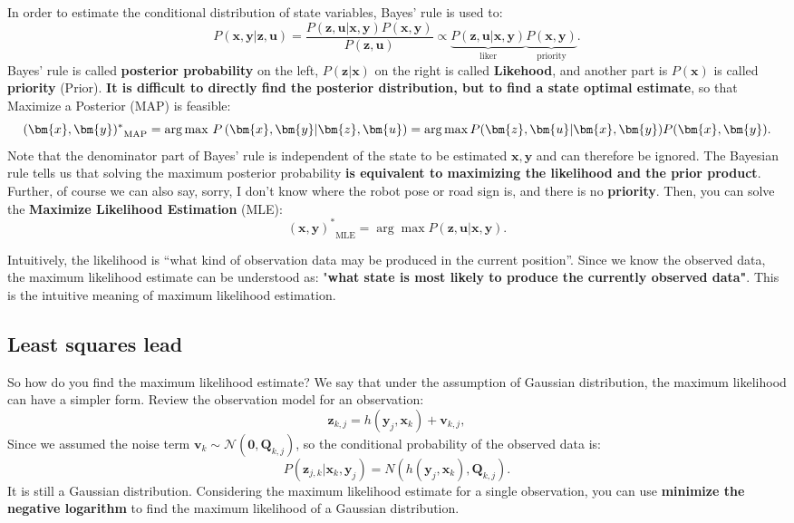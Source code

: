 In order to estimate the conditional distribution of state variables, Bayes' rule is used to:
\begin{equation}
P\left( { \bm{x},\bm{y}| \bm{z}, \bm{u}} \right) = \frac{{P\left( {\bm{z},\bm {u}|\bm{x},\bm{y}} \right)P\left( \bm{x}, \bm{y} \right)}}{{P\left( \bm{z} ,\bm{u}\right)}} \propto \underbrace{P\left( { \bm{z},\bm{u}| \bm{x},\bm{y} } \right)}_ {\text{liker}} \underbrace{P\left( \bm{x},\bm{y} \right)}_{\text{priority}}.
\end{equation}
Bayes' rule is called \textbf{posterior probability} on the left, $P(\bm{z}|\bm{x})$ on the right is called \textbf{Likehood}, and another part is $ P(\bm{x})$ is called \textbf{priority} (Prior). \textbf{It is difficult to directly find the posterior distribution, but to find a state optimal estimate}, so that Maximize a Posterior (MAP) is feasible:
\begin{equation}
{(\bm{x},\bm{y})^*}_{\mathrm{MAP}} = \arg {\mathop{\rm max}\nolimits}\ P \left( {\bm{x} ,\bm{y}|\bm{z},\bm{u}} \right) = \arg \max P(\bm{z},\bm{u}|\bm{x},\bm{ y})P(\bm{x},\bm{y}).
\end{equation}
Note that the denominator part of Bayes' rule is independent of the state to be estimated $\bm{x}, \bm{y}$ and can therefore be ignored. The Bayesian rule tells us that solving the maximum posterior probability \textbf{ is equivalent to maximizing the likelihood and the prior product}. Further, of course we can also say, sorry, I don't know where the robot pose or road sign is, and there is no \textbf{priority}. Then, you can solve the \textbf{Maximize Likelihood Estimation} (MLE):
\begin{equation}
{ (\bm{x},\bm{y})^*}_{\mathrm{MLE}} = \arg \max P( \bm{z},\bm{u}| \bm{x}, \bm{y}).
\end{equation}

Intuitively, the likelihood is “what kind of observation data may be produced in the current position”. Since we know the observed data, the maximum likelihood estimate can be understood as: "\textbf{what state is most likely to produce the currently observed data"}. This is the intuitive meaning of maximum likelihood estimation.

\subsection{Least squares lead}
So how do you find the maximum likelihood estimate? We say that under the assumption of Gaussian distribution, the maximum likelihood can have a simpler form. Review the observation model for an observation:
\[
{\bm{z}_{k,j}} = h\left( {{ \bm{y}_j},{ \bm{x}_k}} \right)+ \bm{v}_{k, j},
\]
Since we assumed the noise term ${\bm{v}_k} \sim \mathcal{N}\left( {\bm{0},{{{\bm{Q}}}_{k,j}}} \right)$, so the conditional probability of the observed data is:
\[
P( \bm{z}_{j,k} | \bm{x}_k, \bm{y}_j ) = N\left( h(\bm{y}_j, \bm{x}_k), \bm{Q}_{k,j} \right).
\]
It is still a Gaussian distribution. Considering the maximum likelihood estimate for a single observation, you can use \textbf{minimize the negative logarithm} to find the maximum likelihood of a Gaussian distribution.

